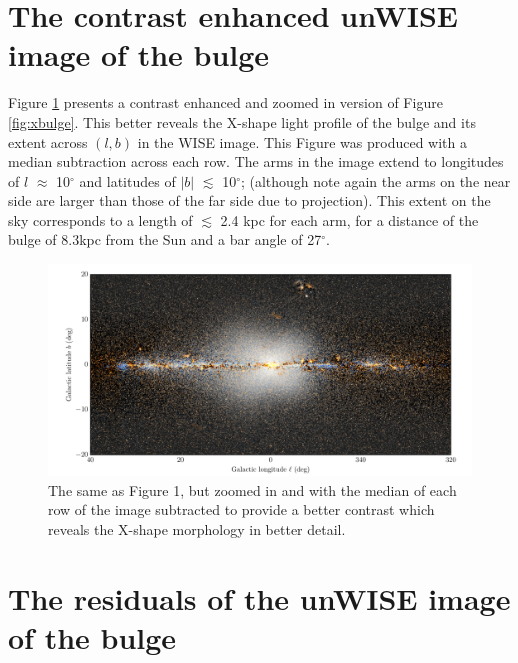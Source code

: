 \documentclass[12pt, preprint]{aastex}
\begin{document}
\section{The contrast enhanced unWISE image of the bulge}

Figure \ref{fig:filt} presents a contrast enhanced and zoomed in version of Figure \ref{fig:xbulge}. This better reveals the X-shape light profile of the bulge and its extent across $(l,b)$ in the WISE image. This Figure was produced with a median subtraction across each row. The arms in the image extend to longitudes of $l$ $\approx$ 10$^\circ$ and latitudes of $|b|$ $\lesssim$ 10$^\circ$; (although note again the arms on the near side are larger than those of the far side due to projection). This extent on the sky corresponds to a length of $\lesssim$ 2.4 kpc for each arm, for a distance of the bulge of 8.3kpc from the Sun and a bar angle of 27$^\circ$. 

\begin{figure}[h!]
\centering
        \includegraphics[width=\textwidth]{xbulge-01}
\caption{The same as Figure 1, but zoomed in and with the median of each row of the image subtracted to provide a better contrast which reveals the X-shape morphology in better detail.}
\label{fig:filt}
\end{figure}

\section{The residuals of the unWISE image of the bulge}
\end{document}
